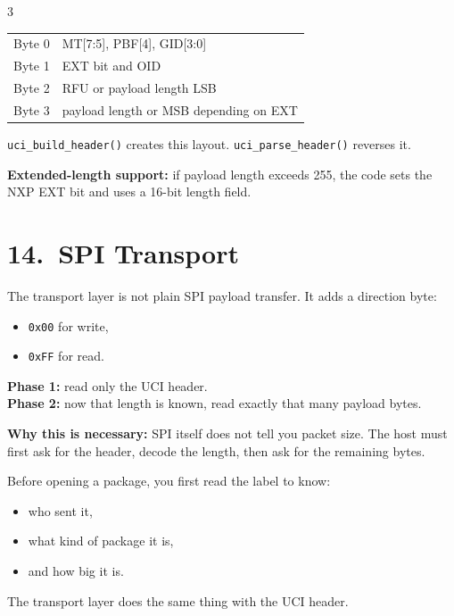 \documentclass[10pt]{article}
\begin{document}
\begin{multicols*}{3}
\begin{tcolorbox}[newbox={UCI Header}]
\begin{tabular}{@{}ll@{}}
Byte 0 & MT[7:5], PBF[4], GID[3:0] \\
Byte 1 & EXT bit and OID \\
Byte 2 & RFU or payload length LSB \\
Byte 3 & payload length or MSB depending on EXT \\
\end{tabular}
\end{tcolorbox}

\texttt{uci\_build\_header()} creates this layout.
\texttt{uci\_parse\_header()} reverses it.

\textbf{Extended-length support:}
if payload length exceeds 255, the code sets the NXP EXT bit and uses a 16-bit length field.

\section*{14.\ SPI Transport}

The transport layer is not plain SPI payload transfer. It adds a direction byte:
\begin{itemize}
  \item \texttt{0x00} for write,
  \item \texttt{0xFF} for read.
\end{itemize}

\begin{tcolorbox}[intubox={Two-Phase Read}]
\textbf{Phase 1:} read only the UCI header.\\
\textbf{Phase 2:} now that length is known, read exactly that many payload bytes.
\end{tcolorbox}

\textbf{Why this is necessary:}
SPI itself does not tell you packet size. The host must first ask for the header, decode the length, then ask for the remaining bytes.

\begin{tcolorbox}[analogybox={Analogy --- Reading A Mailing Label First}]
Before opening a package, you first read the label to know:
\begin{itemize}
  \item who sent it,
  \item what kind of package it is,
  \item and how big it is.
\end{itemize}
The transport layer does the same thing with the UCI header.
\end{tcolorbox}


\end{multicols*}
\end{document}
